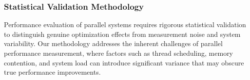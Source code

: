 \subsubsection{Statistical Validation Methodology}

Performance evaluation of parallel systems requires rigorous statistical validation to distinguish genuine optimization effects from measurement noise and system variability. Our methodology addresses the inherent challenges of parallel performance measurement, where factors such as thread scheduling, memory contention, and system load can introduce significant variance that may obscure true performance improvements.

